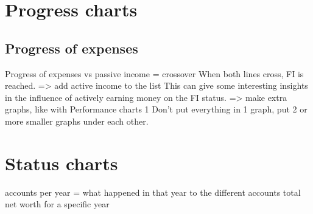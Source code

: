 \documentclass[12pt]{article}
\begin{document}
\section{Progress charts}
\subsection{Progress of expenses}
Progress of expenses vs passive income = crossover
When both lines cross, FI is reached.
=> add active income to the list
This can give some interesting insights in the influence of actively earning money on the FI status.
=> make extra graphs, like with Performance charts 1
Don't put everything in 1 graph, put 2 or more smaller graphs under each other.

\section{Status charts}
accounts per year = what happened in that year to the different accounts
total net worth for a specific year
\end{document}
